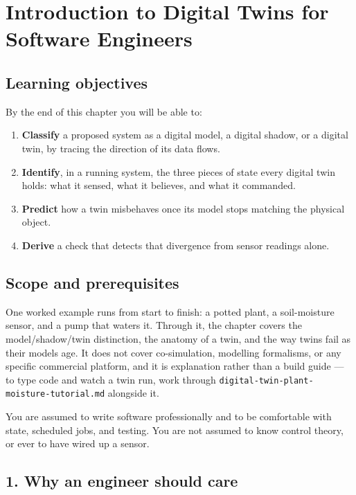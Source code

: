 \documentclass[
  12pt,
  a4paper,
]{article}
\author{}
\date{}
\providecommand{\tightlist}{%
  \setlength{\itemsep}{0pt}\setlength{\parskip}{0pt}}
\begin{document}
\section{Introduction to Digital Twins for Software
Engineers}\label{introduction-to-digital-twins-for-software-engineers}

\subsection{Learning objectives}\label{learning-objectives}

By the end of this chapter you will be able to:

\begin{enumerate}
\def\labelenumi{\arabic{enumi}.}
\tightlist
\item
  \textbf{Classify} a proposed system as a digital model, a digital
  shadow, or a digital twin, by tracing the direction of its data flows.
\item
  \textbf{Identify}, in a running system, the three pieces of state
  every digital twin holds: what it sensed, what it believes, and what
  it commanded.
\item
  \textbf{Predict} how a twin misbehaves once its model stops matching
  the physical object.
\item
  \textbf{Derive} a check that detects that divergence from sensor
  readings alone.
\end{enumerate}

\subsection{Scope and prerequisites}\label{scope-and-prerequisites}

One worked example runs from start to finish: a potted plant, a
soil-moisture sensor, and a pump that waters it. Through it, the chapter
covers the model/shadow/twin distinction, the anatomy of a twin, and the
way twins fail as their models age. It does not cover co-simulation,
modelling formalisms, or any specific commercial platform, and it is
explanation rather than a build guide --- to type code and watch a twin
run, work through \texttt{digital-twin-plant-moisture-tutorial.md}
alongside it.

You are assumed to write software professionally and to be comfortable
with state, scheduled jobs, and testing. You are not assumed to know
control theory, or ever to have wired up a sensor.

\subsection{1. Why an engineer should
care}\label{why-an-engineer-should-care}
\end{document}
